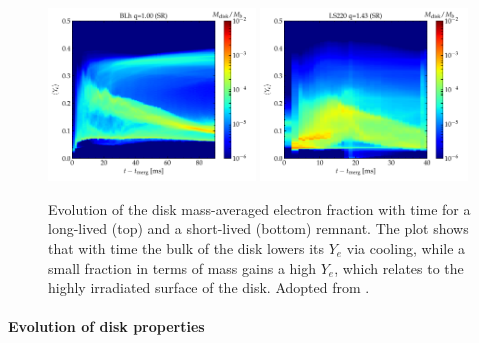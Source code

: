 \documentclass[11pt,a4paper,headinclude=true,DIV=14,BCOR=8mm,chapterprefix,listof=totoc,twoside,openright,abstracton]{scrbook}
\begin{document}
\begin{figure}[t]
    \centering 
    \includegraphics[width=0.49\textwidth]{./figs/disk/final_disk_timecorr_blh_q1_Lk.pdf}
    \includegraphics[width=0.49\textwidth]{./figs/disk/final_disk_timecorr_ls220_q14_LK.pdf}
    \caption{Evolution of the disk mass-averaged electron fraction with
        time for a long-lived (top) and a short-lived (bottom)
        remnant. The plot shows that with time the bulk of the disk lowers
        its $Y_e$ via cooling, while a small fraction in terms of mass
        gains a high $Y_e$, which relates to the highly 
        irradiated surface of the disk. Adopted from \citet{Nedora:2020pak}.
    }
    \label{fig:total_disk_time_corr_Ye_Blh_q1}
\end{figure}

\paragraph{Evolution of disk properties}
\end{document}

